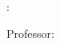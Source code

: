 %	
%	
%	
%

\clearpage

\begin{center}
	\autor

	\vfill

	\MakeUppercase{\textbf{\titulo}}%
	\if\subtitulo\empty\else:\ \fi%
	\textbf{\subtitulo}
\end{center}

\vfill

\begin{adjustwidth}{8cm}{}
%

	\noindent\natureza

	\vspace{1em}

	\noindent Professor: \professor
\end{adjustwidth}

\vfill

\begin{center}
	\cidade\\
	\ano
\end{center}
